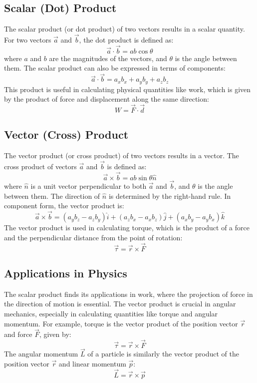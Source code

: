 \documentclass{article}
\begin{document}
\subsection*{Scalar (Dot) Product}
The scalar product (or dot product) of two vectors results in a scalar quantity. For two vectors $\vec{a}$ and $\vec{b}$, the dot product is defined as:
\[
\vec{a} \cdot \vec{b} = ab \cos \theta
\]
where $a$ and $b$ are the magnitudes of the vectors, and $\theta$ is the angle between them. The scalar product can also be expressed in terms of components:
\[
\vec{a} \cdot \vec{b} = a_x b_x + a_y b_y + a_z b_z
\]
This product is useful in calculating physical quantities like work, which is given by the product of force and displacement along the same direction:
\[
W = \vec{F} \cdot \vec{d}
\]

\subsection*{Vector (Cross) Product}
The vector product (or cross product) of two vectors results in a vector. The cross product of vectors $\vec{a}$ and $\vec{b}$ is defined as:
\[
\vec{a} \times \vec{b} = ab \sin \theta \hat{n}
\]
where $\hat{n}$ is a unit vector perpendicular to both $\vec{a}$ and $\vec{b}$, and $\theta$ is the angle between them. The direction of $\hat{n}$ is determined by the right-hand rule. In component form, the vector product is:
\[
\vec{a} \times \vec{b} = (a_y b_z - a_z b_y) \hat{i} + (a_z b_x - a_x b_z) \hat{j} + (a_x b_y - a_y b_x) \hat{k}
\]
The vector product is used in calculating torque, which is the product of a force and the perpendicular distance from the point of rotation:
\[
\vec{\tau} = \vec{r} \times \vec{F}
\]

\subsection*{Applications in Physics}
The scalar product finds its applications in work, where the projection of force in the direction of motion is essential. The vector product is crucial in angular mechanics, especially in calculating quantities like torque and angular momentum. For example, torque is the vector product of the position vector $\vec{r}$ and force $\vec{F}$, given by:
\[
\vec{\tau} = \vec{r} \times \vec{F}
\]
The angular momentum $\vec{L}$ of a particle is similarly the vector product of the position vector $\vec{r}$ and linear momentum $\vec{p}$:
\[
\vec{L} = \vec{r} \times \vec{p}
\]
\end{document}
